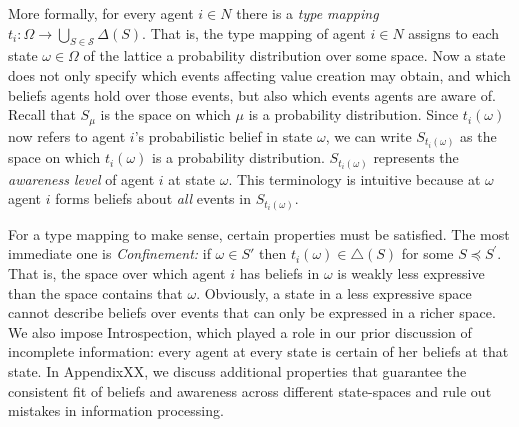 \documentclass[
11pt,
titlepage,
reqno,
]{article}%
\theoremstyle{definition}
\begin{document}
More formally, for every agent $i \in N$ there is a \textit{type mapping} $t_{i}: \Omega \longrightarrow \bigcup_{S \in \mathcal{S}} \Delta(S)$. That is, the type mapping of agent $i \in N$ assigns to each state $\omega \in \Omega$ of the lattice a probability distribution over some space. Now a state does not only specify which events affecting value creation may obtain, and which beliefs agents hold over those events, but also which events agents are aware of. Recall that $S_{\mu}$ is the space on which $\mu$ is a probability distribution. Since $t_i(\omega)$ now refers to agent $i$'s probabilistic belief in state $\omega$, we can write $S_{t_i(\omega)}$ as the space on which $t_i(\omega)$ is a probability distribution. $S_{t_i(\omega)}$ represents the \emph{awareness level} of agent $i$ at state $\omega$. This terminology is intuitive because at $\omega$ agent $i$ forms beliefs about \textit{all} events in $S_{t_i(\omega)}$.

For a type mapping to make sense, certain properties must be satisfied. The most immediate one is \textit{Confinement:} if $\omega \in S'$ then $t_{i}(\omega )\in \triangle \left( S \right)$ for some $S \preceq S^{\prime}$. That is, the space over which agent $i$ has beliefs in $\omega$ is weakly less expressive than the space contains that $\omega$. Obviously,  a state in a less expressive space cannot describe beliefs over events that can only be expressed in a richer space.  We also impose Introspection, which played a role in our prior discussion of incomplete information: every agent at every state is certain of her beliefs at that state. In AppendixXX, we discuss additional properties that guarantee the consistent fit of beliefs and awareness across different state-spaces and rule out mistakes in information processing.
\end{document}

